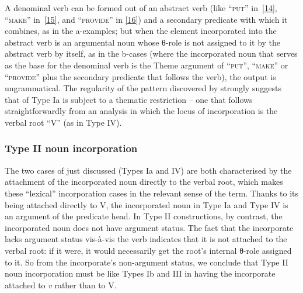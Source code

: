 \documentclass[output=paper]{langsci/langscibook}
\begin{document}
\begin{refcontext}
\ea \label{14}
    \z
\ex \label{15}
    \z
\ex \label{16}
    \z
\z
A denominal verb can be formed out of an abstract verb (like
\enquote{\textsc{put}} in~\eqref{14}, \enquote{\textsc{make}} in~\eqref{15},
and \enquote{\textsc{provide}} in \eqref{16}) and a secondary predicate with
which it combines, as in the a-examples; but when the element incorporated into
the abstract verb is an argumental noun whose θ-role is not assigned to it by
the abstract verb by itself, as in the b-cases (where the incorporated noun
that serves as the base for the denominal verb is the Theme argument of
\enquote{\textsc{put}}, \enquote{\textsc{make}} or \enquote{\textsc{provide}}
plus the secondary predicate that follows the verb), the output is
ungrammatical. The regularity of the pattern discovered by \citet{halekeyser}
strongly suggests that  of Type Ia is subject to a
thematic restriction -- one that follows straightforwardly from an analysis in
which the locus of incorporation is the verbal root \enquote{V} (as in Type
IV).

\subsubsection{Type II noun incorporation}

The two cases of  just discussed (Types Ia and IV) are
both characterised by the attachment of the incorporated noun directly to the
verbal root, which makes these \enquote{lexical} incorporation cases in the
relevant sense of the term. Thanks to its being attached directly to V, the
incorporated noun in Type Ia and Type IV is an argument of the predicate
head. In Type II constructions, by contrast, the incorporated noun does not
have argument status. The fact that the incorporate lacks argument status
vis-\`a-vis the verb indicates that it is not attached to the verbal root: if
it were, it would necessarily get the root's internal θ-role assigned to it.
So from the incorporate's non-argument status, we conclude that Type II noun
incorporation must be like Types Ib and III in having the incorporate
attached to \emph{v} rather than to V.


\end{refcontext}
\end{document}
